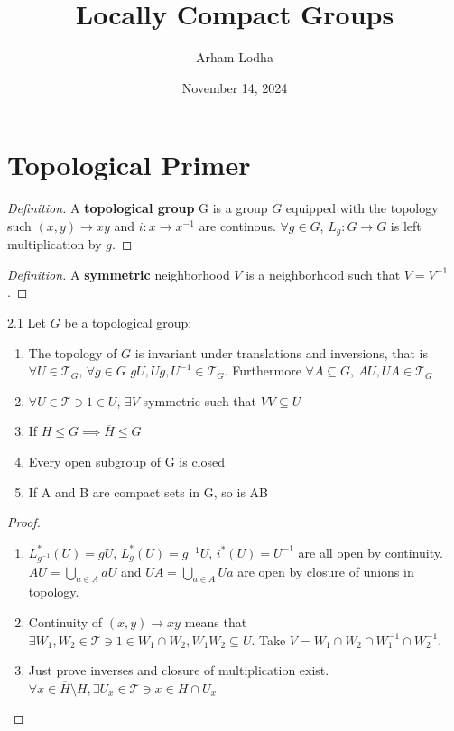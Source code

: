\documentclass{article}
\newcommand*{\T}{\mathcal{T}}
\newcommand*{\subeq}{\subseteq}
\newenvironment{definition}
{\renewcommand\qedsymbol{$\blacksquare$}\begin{proof}[Definition]}
{\end{proof}}
\begin{document}
\title{Locally Compact Groups}
\author{Arham Lodha}%
\date{November 14, 2024}%
\maketitle

\section*{Topological Primer}

\begin{definition}
    A \textbf{topological group} G is a group $G$ equipped with the topology such $(x, y) \to xy$ and $i: x \to x^{-1}$ are continous. $\forall g \in G$, $L_g : G \to G$ is left multiplication by $g$.     
\end{definition}

\begin{definition}
    A \textbf{symmetric} neighborhood $V$ is a neighborhood such that $V = V^{-1}$.   
\end{definition}

\begin{claim}{2.1}\label{Claim 2.1.}
    Let $G$ be a topological group: 
    
    \begin{enumerate}
        \item The topology of $G$ is invariant under translations and inversions, that is $\forall U \in \T_G$, $\forall g \in G$ $gU, Ug, U^{-1} \in \T_G$. Furthermore $\forall A \subeq G$, $AU, UA \in \T_G$
        \item $\forall U \in \T \ni 1 \in U$, $\exists V$ symmetric such that $V V \subeq U$  
        \item If $H \leq G \implies \overline{H} \leq G$ 
        \item Every open subgroup of G is closed
        \item If A and B are compact sets in G, so is AB    
    \end{enumerate}
    
\end{claim}
\begin{proof}
    \begin{enumerate}
        \item $L_{g^{-1}}^*(U) = gU$, $L_{g}^*(U) = g^{-1}U$, $i^*(U) = U^{-1}$ are all open by continuity. $AU = \bigcup_{a \in A} aU$ and $UA = \bigcup_{a \in A} Ua$ are open by closure of unions in topology. 
        \item Continuity of $(x, y) \to xy$ means that $\exists W_1, W_2 \in \T \ni 1 \in W_1 \cap W_2, W_1 W_2 \subeq U$. Take $V = W_1 \cap W_2 \cap W_1^{-1} \cap W_2^{-1}$.
        \item Just prove inverses and closure of multiplication exist. $\forall x \in \overline{H} \setminus H, \exists U_x \in \T \ni x \in H \cap U_x$         
    \end{enumerate}
    
\end{proof}
\end{document}
